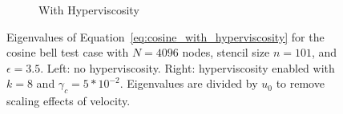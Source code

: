 \documentclass{report}
\begin{document}
\begin{figure}[ht!]
\begin{center}
\begin{subfigure}[b]{0.45\textwidth}
	\caption{With Hyperviscosity}
	\label{fig:cosine_eigs_hv}
\end{subfigure}
\caption{Eigenvalues of Equation~\ref{eq:cosine_with_hyperviscosity} for the cosine bell test case with $N=4096$ nodes, stencil size $n=101$, and $\epsilon = 3.5$. Left: no hyperviscosity. Right: hyperviscosity enabled with $k=8$ and $\gamma_c = 5*10^{-2}$. Eigenvalues are divided by $u_0$ to remove scaling effects of velocity.}
\label{fig:eig_cosine}
\end{center}
\end{figure}
%
\end{document}
